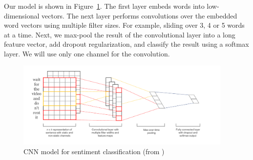 \documentclass{article}
\begin{document}
Our model is shown in Figure~\ref{fig:cnn}. The first layer embeds words into low-dimensional vectors. The next layer performs convolutions over the embedded word vectors using multiple filter sizes. For example, sliding over 3, 4 or 5 words at a time. Next, we max-pool the result of the convolutional layer into a long feature vector, add dropout regularization, and classify the result using a softmax layer. We will use only one channel for the convolution.

\begin{figure}[ht]
\centering
\includegraphics[width=0.95\textwidth]{images/cnn.png}
\caption{CNN model for sentiment classification (from \cite{kim2014convolutional})}
\label{fig:cnn}
\end{figure}
\end{document}
